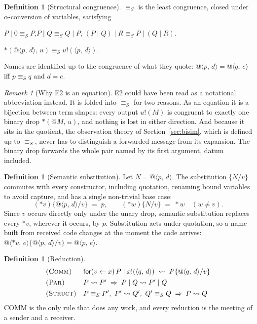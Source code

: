 \documentclass[11pt,a4paper]{article}
\makeatletter
\theoremstyle{plain}
\theoremstyle{definition}
\newtheorem{definition}[theorem]{Definition}
\theoremstyle{remark}
\newtheorem{remark}[theorem]{Remark}
\newcommand{\pr}[2]{\langle #1,\,#2\rangle}
\newcommand{\qn}[2]{@\langle #1,\,#2\rangle}
\newcommand{\out}[2]{#1!(#2)}
\newcommand{\rcv}[3]{\mathsf{for}(#1 \leftarrow #2)\,#3}
\newcommand{\drop}[1]{{*}#1}
\newcommand{\bdrop}[2]{{*}(#1,\,#2)}
\newcommand{\red}{\rightsquigarrow}
\newcommand{\scong}{\equiv_{S}}
\newcommand{\ssub}[2]{\{#1/#2\}}
\makeatother
\begin{document}
\begin{definition}[Structural congruence]\label{def:cong}
$\scong$ is the least congruence, closed under $\alpha$-conversion of
variables, satisfying
\begin{description}[leftmargin=2.5em,style=nextline]
\item[(E1) Monoid] $P\mid 0\scong P$,\quad $P\mid Q\scong Q\mid P$,\quad
  $(P\mid Q)\mid R\scong P\mid(Q\mid R)$.
\item[(E2) Binary drop] $\bdrop{\qn{p}{d}}{u}\scong \out{u}{\pr{p}{d}}$.
\end{description}
Names are identified up to the congruence of what they quote:
$\qn{p}{d}=\qn{q}{e}$ iff $p\scong q$ and $d=e$.
\end{definition}

\begin{remark}[Why E2 is an equation]
E2 could have been read as a notational abbreviation instead. It is folded into
$\scong$ for two reasons. As an equation it is a bijection between term
shapes: every output $\out{u}{M}$ is congruent to exactly one binary drop
$\bdrop{@M}{u}$, and nothing is lost in either direction. And because it sits in
the quotient, the observation theory of Section~\ref{sec:bisim}, which is
defined up to $\scong$, never has to distinguish a forwarded message from its
expansion. The binary drop forwards the whole pair named by its first
argument, datum included.
\end{remark}

\begin{definition}[Semantic substitution]\label{def:sub}
Let $N=\qn{p}{d}$. The substitution $\ssub{N}{v}$ commutes with every
constructor, including quotation, renaming bound variables to avoid capture,
and has a single non-trivial base case:
\[
  (\drop{v})\ssub{\qn{p}{d}}{v} \;=\; p,
  \qquad
  (\drop{w})\ssub{N}{v} \;=\; \drop{w}\quad (w\neq v).
\]
Since $v$ occurs directly only under the unary drop, semantic substitution
replaces every $\drop{v}$, wherever it occurs, by $p$. Substitution acts under
quotation, so a name built from received code changes at the moment the code
arrives: $\qn{\drop{v}}{e}\ssub{\qn{p}{d}}{v}=\qn{p}{e}$.
\end{definition}

\begin{definition}[Reduction]\label{def:red}
\[
\begin{array}{ll}
\textsc{(Comm)} & \rcv{v}{x}{P}\mid\out{x}{\pr{q}{d}}
                  \;\red\; P\ssub{\qn{q}{d}}{v}\\[4pt]
\textsc{(Par)} & P\red P' \;\Rightarrow\; P\mid Q\red P'\mid Q\\[4pt]
\textsc{(Struct)} & P\scong P',\ P'\red Q',\ Q'\scong Q
                    \;\Rightarrow\; P\red Q
\end{array}
\]
COMM is the only rule that does any work, and every reduction is the meeting of
a sender and a receiver.
\end{definition}
\end{document}

